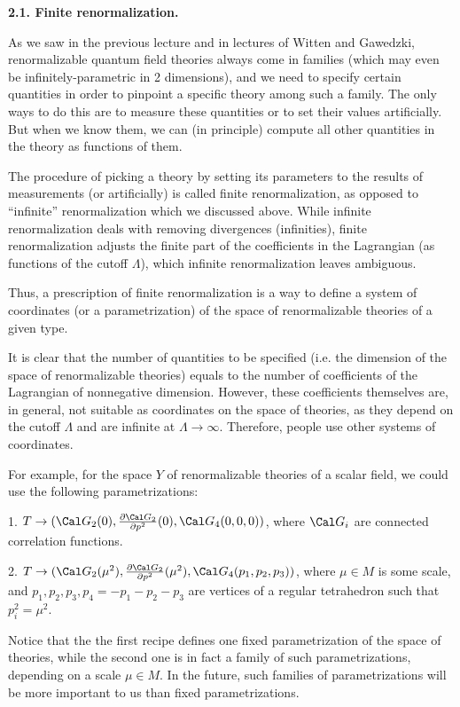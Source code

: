 {\bf 2.1. Finite renormalization.}

As we saw in the 
previous lecture and in lectures of Witten and Gawedzki,
renormalizable quantum field theories 
 always come in families (which may even be 
infinitely-parametric in 2 dimensions), and we need to specify 
certain quantities in order to pinpoint a specific theory among such a family.
The only ways to do this are
to measure these quantities or to set their values artificially. 
But when we know them, we can (in principle) compute all 
other quantities in the theory as functions of them. 

The procedure of picking a theory by setting its parameters to the
results of measurements (or artificially) 
is called finite renormalization, as opposed
to ``infinite'' renormalization which we discussed above. While infinite
renormalization deals with removing divergences (infinities), finite
renormalization adjusts the finite part of the 
coefficients in the Lagrangian (as functions of the cutoff $\Lambda$),
which infinite renormalization leaves ambiguous. 

Thus, a prescription of finite renormalization
is a way to define a system of coordinates (or a parametrization)
of the space of renormalizable theories of a given type. 

It is clear that the number of quantities to be specified (i.e.
the dimension of the space of renormalizable theories) equals to the number
of coefficients of the Lagrangian of nonnegative dimension. 
However, these coefficients themselves are, in general, 
not suitable as coordinates on the space of theories, 
as they depend on the cutoff $\Lambda$ and are infinite at $\Lambda\to\infty$.
Therefore, people use other systems of
coordinates. 

For example, for the space $Y$ of renormalizable theories 
of a scalar field, we could use the following 
parametrizations:

1. $T\to ({\Cal G}_2(0),\frac{\d {\Cal G}_2}{\d p^2}(0), 
{\Cal G}_4(0,0,0))$, where ${\Cal G}_i$ are connected
correlation functions. 

2. $T\to ({\Cal G}_2(\mu^2),\frac{\d {\Cal G}_2}{\d p^2}(\mu^2), 
{\Cal G}_4(p_1,p_2,p_3))$, where 
$\mu\in M$ is some scale, and 
$p_1,p_2,p_3,p_4=-p_1-p_2-p_3$ are vertices 
of a regular tetrahedron such that $p_i^2=\mu^2$. 

Notice that the the first recipe defines one fixed parametrization 
of the space of theories, while the second one is in fact a family 
of such parametrizations, depending on a scale $\mu\in M$. 
In the future, such families of parametrizations will be more important to
us than fixed parametrizations. 

